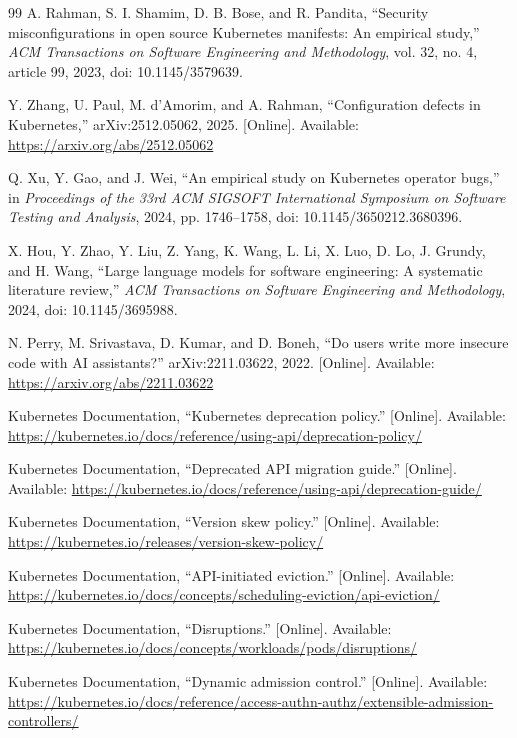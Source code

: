 \documentclass[10pt,journal]{IEEEtran}
\begin{document}
\begin{thebibliography}{99}
A. Rahman, S. I. Shamim, D. B. Bose, and R. Pandita, ``Security misconfigurations in open source Kubernetes manifests: An empirical study,'' \emph{ACM Transactions on Software Engineering and Methodology}, vol. 32, no. 4, article 99, 2023, doi: 10.1145/3579639.

Y. Zhang, U. Paul, M. d'Amorim, and A. Rahman, ``Configuration defects in Kubernetes,'' arXiv:2512.05062, 2025. [Online]. Available: \url{https://arxiv.org/abs/2512.05062}

Q. Xu, Y. Gao, and J. Wei, ``An empirical study on Kubernetes operator bugs,'' in \emph{Proceedings of the 33rd ACM SIGSOFT International Symposium on Software Testing and Analysis}, 2024, pp. 1746--1758, doi: 10.1145/3650212.3680396.

X. Hou, Y. Zhao, Y. Liu, Z. Yang, K. Wang, L. Li, X. Luo, D. Lo, J. Grundy, and H. Wang, ``Large language models for software engineering: A systematic literature review,'' \emph{ACM Transactions on Software Engineering and Methodology}, 2024, doi: 10.1145/3695988.

N. Perry, M. Srivastava, D. Kumar, and D. Boneh, ``Do users write more insecure code with AI assistants?'' arXiv:2211.03622, 2022. [Online]. Available: \url{https://arxiv.org/abs/2211.03622}

Kubernetes Documentation, ``Kubernetes deprecation policy.'' [Online]. Available: \url{https://kubernetes.io/docs/reference/using-api/deprecation-policy/}

Kubernetes Documentation, ``Deprecated API migration guide.'' [Online]. Available: \url{https://kubernetes.io/docs/reference/using-api/deprecation-guide/}

Kubernetes Documentation, ``Version skew policy.'' [Online]. Available: \url{https://kubernetes.io/releases/version-skew-policy/}

Kubernetes Documentation, ``API-initiated eviction.'' [Online]. Available: \url{https://kubernetes.io/docs/concepts/scheduling-eviction/api-eviction/}

Kubernetes Documentation, ``Disruptions.'' [Online]. Available: \url{https://kubernetes.io/docs/concepts/workloads/pods/disruptions/}

Kubernetes Documentation, ``Dynamic admission control.'' [Online]. Available: \url{https://kubernetes.io/docs/reference/access-authn-authz/extensible-admission-controllers/}


\end{thebibliography}
\end{document}
